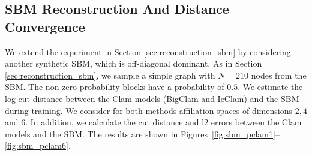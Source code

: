 \documentclass[letterpaper]{article} %
\begin{document}
\subsection{SBM Reconstruction And Distance Convergence}
We extend the experiment in Section \ref{sec:reconstruction_sbm} by considering another  synthetic SBM, which is off-diagonal dominant. As in Section \ref{sec:reconstruction_sbm}, we sample a simple graph with $N=210$ nodes from the SBM. The non zero probability blocks have a probability of $0.5$. We estimate the log cut distance between the Clam models (BigClam and IeClam) and the SBM during training. We consider for both methods affiliation spaces of dimensions $2,4$ and $6$. In addition, we calculate the cut distance and l2 errors between the Clam models and the SBM. The results are shown in Figures~\ref{fig:sbm_pclam1}--\ref{fig:sbm_pclam6}.
\end{document}
